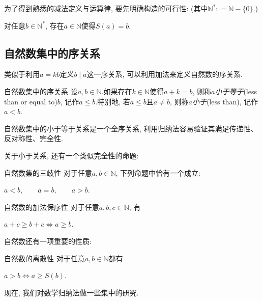 为了得到熟悉的减法定义与运算律, 要先明确构造的可行性: (其中$\mathbb{N}^* : = \mathbb{N} - \{ 0 \}$.)

\begin{proposition}{} \label{pro:jmfagzzckexkxk}
	对任意$b \in \mathbb{N}^*$, 存在$a \in \mathbb{N}$使得$S(a)=b$.
\end{proposition}

\subsection{自然数集中的序关系}

类似于利用$a=kb$定义$b \mid a$这一序关系, 可以利用加法来定义自然数的序关系.

\begin{definition}{自然数集中的序关系}
	设$a, b \in \mathbb{N}$.如果存在$k \in \mathbb{N}$使得$a+k=b$, 则称$a$\textit{小于等于}(less than or equal to)$b$, 记作$a \leq b$.特别地, 若$a \leq b$且$a \neq b$, 则称$a$\textit{小于}(less than), 记作$a<b$.
\end{definition}

自然数集中的小于等于关系是一个全序关系, 利用归纳法容易验证其满足传递性、反对称性、完全性.

关于小于关系, 还有一个类似完全性的命题: 

\begin{proposition}{自然数集的三歧性}
	对于任意$a, b \in \mathbb{N}$, 下列命题中恰有一个成立: 
	\begin{center}
		$a<b,  \qquad a=b,  \qquad a>b.$
	\end{center}
\end{proposition}


\begin{proposition}{自然数的加法保序性}
	对于任意$a, b, c \in \mathbb{N}$, 有
	\begin{center}
		$a+c \geq b+c \Leftrightarrow a \geq b.$
	\end{center}
\end{proposition}

自然数还有一项重要的性质: 

\begin{proposition}{自然数的离散性}
	对于任意$a, b \in \mathbb{N}$都有
	\begin{center}
		$a>b \Leftrightarrow a \geq S(b).$
	\end{center}
\end{proposition}

现在, 我们对数学归纳法做一些集中的研究.

